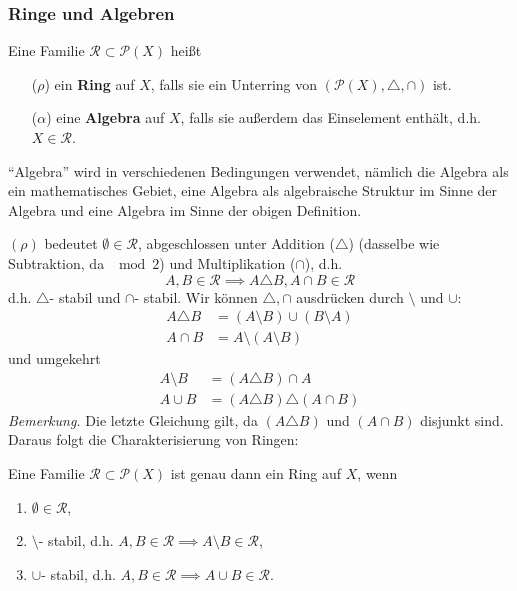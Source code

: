 \subsubsection{Ringe und Algebren}
\begin{definition}
\begin{mdframed}
Eine Familie $\mathcal{R}\subset \mathcal{P}(X)$ heißt
\begin{enumerate}[itemsep=0pt,topsep=3pt]
\item[($\rho$)] ein \textbf{Ring} auf $X$, falls sie ein Unterring von $(\mathcal{P}(X), \triangle, \cap)$ ist.
\item[($\alpha$)] eine \textbf{Algebra} auf $X$, falls sie außerdem das Einselement enthält, d.h. $X \in \mathcal{R}$.
\end{enumerate}
\end{mdframed}
\end{definition}
\begin{remark}
\begin{small}
``Algebra'' wird in verschiedenen Bedingungen verwendet, nämlich die Algebra als ein mathematisches Gebiet, eine Algebra als algebraische Struktur im Sinne der Algebra und eine Algebra im Sinne der obigen Definition.
\end{small}
\end{remark}
$(\rho)$ bedeutet $\emptyset \in \mathcal{R}$, abgeschlossen unter Addition ($\triangle$) (dasselbe wie Subtraktion, da $\mod 2$) und Multiplikation ($\cap$), d.h.
\begin{equation*}
A,B \in \mathcal{R} \implies A\triangle B, A\cap B \in \mathcal{R}
\end{equation*} 
d.h. $\triangle$- stabil und $\cap$- stabil. Wir können $\triangle, \cap$ ausdrücken durch $\setminus$ und $\cup$:
\begin{align*}
A \triangle B & = (A \setminus B) \cup (B \setminus A) \\
A \cap B & = A \setminus (A \setminus B)
\end{align*}
und umgekehrt
\begin{align*}
A \setminus B &= (A \triangle B) \cap A \\
A \cup B &= (A \triangle B) \triangle (A \cap B)
\end{align*}
\textit{Bemerkung.} Die letzte Gleichung gilt, da $(A\triangle B)$ und $(A\cap B)$ disjunkt sind. \newline \newline
Daraus folgt die Charakterisierung von Ringen:
\begin{lemma}
\begin{mdframed}
Eine Familie $\mathcal{R}\subset \mathcal{P}(X)$ ist genau dann ein Ring auf $X$, wenn
\begin{enumerate}[(\roman*), topsep=3pt, itemsep=0pt]
\item $\emptyset \in \mathcal{R}$,
\item $\setminus$- stabil, d.h. $A,B \in \mathcal{R} \implies A \setminus B \in \mathcal{R}$,
\item $\cup$- stabil, d.h. $A, B \in \mathcal{R} \implies A \cup B \in \mathcal{R}$.
\end{enumerate}
\end{mdframed}
\end{lemma}
